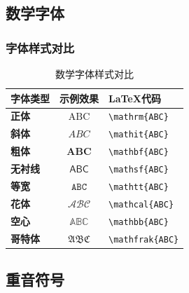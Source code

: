 \documentclass{article}
\begin{document}
\subsection{数学字体}

\subsubsection{字体样式对比}
\begin{table}[H]
      \centering
      \begin{tabular}{>{\bfseries}l|c|>{\ttfamily}l}
            \hline
            \textbf{字体类型} & \textbf{示例效果}    & \textbf{LaTeX代码}      \\
            \hline
            正体            & $\mathrm{ABC}$   & \verb|\mathrm{ABC}|   \\
            斜体            & $\mathit{ABC}$   & \verb|\mathit{ABC}|   \\
            粗体            & $\mathbf{ABC}$   & \verb|\mathbf{ABC}|   \\
            无衬线           & $\mathsf{ABC}$   & \verb|\mathsf{ABC}|   \\
            等宽            & $\mathtt{ABC}$   & \verb|\mathtt{ABC}|   \\
            花体            & $\mathcal{ABC}$  & \verb|\mathcal{ABC}|  \\
            空心            & $\mathbb{ABC}$   & \verb|\mathbb{ABC}|   \\
            哥特体           & $\mathfrak{ABC}$ & \verb|\mathfrak{ABC}| \\
            \hline
      \end{tabular}
      \caption{数学字体样式对比}
\end{table}

\subsection{重音符号}
\end{document}
